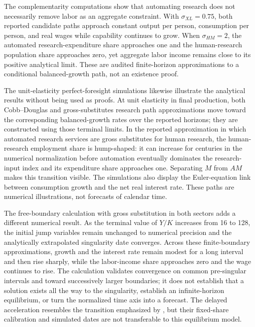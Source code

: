 The complementarity computations show that automating research does not
necessarily remove labor as an aggregate constraint. With
\(\sigma_{XL}=0.75\), both reported candidate paths approach constant output per
person, consumption per person, and real wages while capability continues to
grow. When \(\sigma_{HM}=2\), the automated research-expenditure share approaches
one and the human-research population share approaches zero, yet aggregate labor
income remains close to its positive analytical limit. These are audited
finite-horizon approximations to a conditional balanced-growth path, not an
existence proof.

The unit-elasticity perfect-foresight simulations likewise illustrate the
analytical results without being used as proofs. At unit elasticity in final production,
both Cobb--Douglas and gross-substitutes research path approximations move toward
the corresponding balanced-growth rates over the reported horizons; they are
constructed using those terminal limits.
In the reported approximation in which automated research services are gross
substitutes for human research, the human-research employment share is hump-shaped:
it can increase for centuries in the numerical normalization before automation
eventually dominates the research-input index and its expenditure share approaches
one. Separating
\(M\) from \(AM\) makes this transition visible. The simulations also display
the Euler-equation link between consumption growth and the net real interest
rate. These paths are numerical illustrations, not forecasts of calendar time.

The free-boundary calculation with gross substitution in both sectors adds a
different numerical result. As the terminal value of \(Y/K\) increases from 16
to 128, the initial jump variables remain unchanged to numerical precision and
the analytically extrapolated singularity date converges. Across these
finite-boundary approximations, growth and the interest rate remain modest for a
long interval and then rise sharply, while the labor-income share approaches zero
and the wage continues to rise. The calculation validates convergence on common
pre-singular intervals and toward successively larger boundaries; it does not
establish that a solution exists all the way to the singularity, establish an
infinite-horizon equilibrium, or turn the normalized time axis into a forecast.
The delayed acceleration resembles the transition emphasized by
\citet{davidsonetal2026}, but their fixed-share calibration and simulated dates
are not transferable to this equilibrium model.


